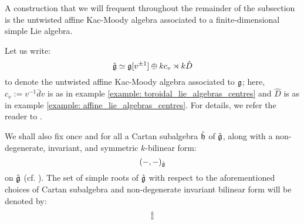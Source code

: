         A construction that we will frequent throughout the remainder of the subsection is the untwisted affine Kac-Moody algebra associated to a finite-dimensional simple Lie algebra.
        \begin{convention} \label{conv: a_fixed_untwisted_affine_kac_moody_algebra}
            Let us write:
                $$\hat{\mathfrak{g}} \simeq \mathfrak{g}[v^{\pm 1}] \oplus k c_v \rtimes k \hat{D}$$
            to denote the untwisted affine Kac-Moody algebra associated to $\mathfrak{g}$; here, $c_v := v^{-1} \bar{d}v$ is as in example \ref{example: toroidal_lie_algebras_centres} and $\hat{D}$ is as in example \ref{example: affine_lie_algebras_centres}. For details, we refer the reader to \cite[Chapter 7]{kac_infinite_dimensional_lie_algebras}.
            
            We shall also fix once and for all a Cartan subalgebra $\hat{\mathfrak{h}}$ of $\hat{\mathfrak{g}}$, along with a non-degenerate, invariant, and symmetric $k$-bilinear form:
                $$(-, -)_{\hat{\mathfrak{g}}}$$
            on $\hat{\mathfrak{g}}$ (cf. \cite[Chapter 2]{kac_infinite_dimensional_lie_algebras}). The set of simple roots of $\hat{\mathfrak{g}}$ with respect to the aforementioned choices of Cartan subalgebra and non-degenerate invariant bilinear form will be denoted by:
                $$\hat{\mathbb{I}}$$
        \end{convention}

